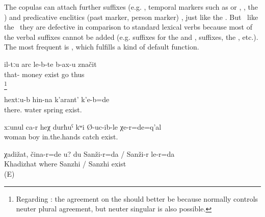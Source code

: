 The copulas can attach further suffixes (e.g. , temporal markers such as  or , , the  )  and predicative enclitics (past marker, person marker) , just like the . But \tnd\ like the  \tnd\ they are defective in comparison to standard lexical verbs because most of the verbal suffixes cannot be added (e.g. suffixes for the  and ,  suffixes, the , etc.). The most frequent  is , which fulfills a kind of default function.
%
\begin{exe}
	\ex	\label{ex:This means that (people) go where the money is}
	\gll	il-tːu	arc	le-b-te 	b-ax-u	značit\\
		that-	money	exist 	go	thus\\
	\glt	{}\footnote{Regarding : the agreement on the  should better be  because   normally controls neuter plural agreement, but neuter singular is also possible.}

	\ex	\label{ex:There was a spring up there}
	\gll	hextːu-b	hin-na	k'arant'	k'e-b=de\\
		there.	water	spring	exist.\\
	\glt	{}

	\ex	\label{ex:That is the woman, the one who was keeping the boy in here hands}
	\gll	xːunul	ca-r	heχ	durħuˁ	kʷi	Ø-uc-ib-le	χe-r=de=q'al\\
		woman			boy	in.the.hands	catch	exist.\\
	\glt	{}

	\ex	\label{ex:‎Khadizhat, where are you? I am in Sanzhi_1}
	\gll	χadižat,	čina-r=de	u?	du	Sanži-r=da	/	Sanži-r	le-r=da\\
		Khadizhat	where			Sanzhi	/ Sanzhi exist\\
	\glt	{} (E)

\end{exe}

